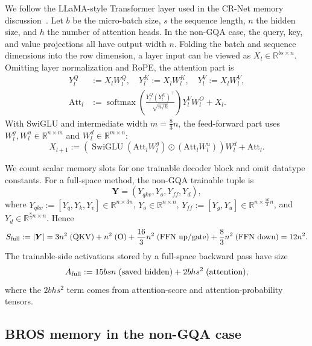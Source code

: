 \documentclass{pkumelon}
\theoremstyle{plain}
\begin{document}
We follow the LLaMA-style Transformer layer used in the CR-Net memory discussion~\citep{kong2025cr}. Let $b$ be the micro-batch size, $s$ the sequence length, $n$ the hidden size, and $h$ the number of attention heads. In the non-GQA case, the query, key, and value projections all have output width $n$. Folding the batch and sequence dimensions into the row dimension, a layer input can be viewed as $X_l\in\mathbb R^{bs\times n}$. Omitting layer normalization and RoPE, the attention part is
\begin{equation*}
\begin{aligned}
Y_l^Q&:=X_lW_l^Q,\quad Y_l^K:=X_lW_l^K,\quad Y_l^V:=X_lW_l^V,\\
\mathrm{Att}_l&:=\operatorname{softmax}\!\left(\frac{Y_l^Q(Y_l^K)^\top}{\sqrt{n/h}}\right)Y_l^VW_l^O+X_l.
\end{aligned}
\end{equation*}
With SwiGLU and intermediate width $m=\frac{8}{3}n$, the feed-forward part uses $W_l^g,W_l^u\in\mathbb R^{n\times m}$ and $W_l^d\in\mathbb R^{m\times n}$:
\begin{equation*}
X_{l+1}:=\left(\operatorname{SwiGLU}(\mathrm{Att}_lW_l^g)\odot(\mathrm{Att}_lW_l^u)\right)W_l^d+\mathrm{Att}_l.
\end{equation*}

We count scalar memory slots for one trainable decoder block and omit datatype constants. For a full-space method, the non-GQA trainable tuple is
\begin{equation*}
\boldsymbol Y=(Y_{qkv},Y_o,Y_{ff},Y_d),
\end{equation*}
where $Y_{qkv}:=[Y_q,Y_k,Y_v]\in\mathbb R^{n\times3n}$, $Y_o\in\mathbb R^{n\times n}$, $Y_{ff}:=[Y_g,Y_u]\in\mathbb R^{n\times\frac{16}{3}n}$, and $Y_d\in\mathbb R^{\frac{8}{3}n\times n}$. Hence
\begin{equation*}
S_{\rm full}:=|\boldsymbol Y|=3n^2\;(\text{QKV})+n^2\;(\text{O})+\frac{16}{3}n^2\;(\text{FFN up/gate})+\frac{8}{3}n^2\;(\text{FFN down})=12n^2.
\end{equation*}
The trainable-side activations stored by a full-space backward pass have size
\begin{equation*}
A_{\rm full}:=15bsn\;(\text{saved hidden})+2bhs^2\;(\text{attention}),
\end{equation*}
where the $2bhs^2$ term comes from attention-score and attention-probability tensors.

\subsection{BROS memory in the non-GQA case}
\label{subsec:bros_memory_non_gqa}
\end{document}
